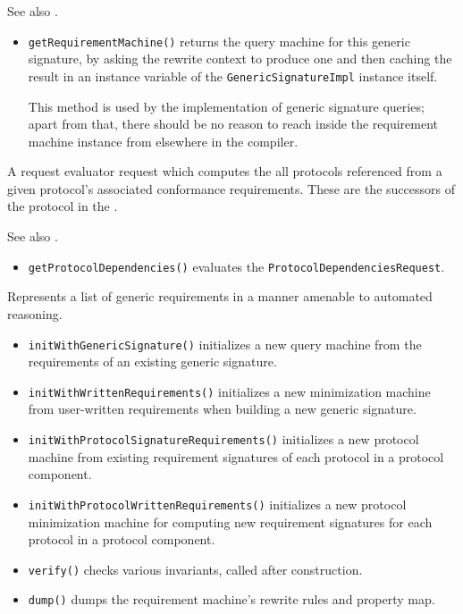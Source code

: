\documentclass[../generics]{subfiles}
\begin{document}
See also .
\begin{itemize}
\item \texttt{getRequirementMachine()} returns the query machine for this generic signature, by asking the rewrite context to produce one and then caching the result in an instance variable of the \texttt{GenericSignatureImpl} instance itself.

This method is used by the implementation of generic signature queries; apart from that, there should be no reason to reach inside the requirement machine instance from elsewhere in the compiler.
\end{itemize}

A request evaluator request which computes the  all protocols referenced from a given protocol's associated conformance requirements. These are the successors of the protocol in the .

See also .
\begin{itemize}
\item \texttt{getProtocolDependencies()} evaluates the \texttt{ProtocolDependenciesRequest}.
\end{itemize}

Represents a list of generic requirements in a manner amenable to automated reasoning.
\begin{itemize}
\item \texttt{initWithGenericSignature()} initializes a new query machine from the requirements of an existing generic signature.
\item \texttt{initWithWrittenRequirements()} initializes a new minimization machine from user-written requirements when building a new generic signature.
\item \texttt{initWithProtocolSignatureRequirements()} initializes a new protocol machine from existing requirement signatures of each protocol in a protocol component.
\item \texttt{initWithProtocolWrittenRequirements()} initializes a new protocol minimization machine for computing new requirement signatures for each protocol in a protocol component.
\item \texttt{verify()} checks various invariants, called after construction.
\item \texttt{dump()} dumps the requirement machine's rewrite rules and property map.
\end{itemize}
\end{document}
